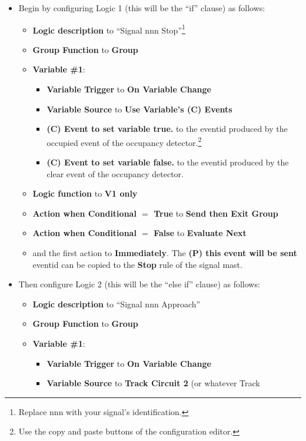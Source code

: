 \begin{itemize}
\item Begin by configuring Logic 1 (this will be the ``if'' clause) as 
follows: 
\begin{itemize}
\item \textbf{Logic description} to ``Signal nnn Stop''\footnote{Replace nnn 
with your signal's identification.}
\item \textbf{Group Function} to \textbf{Group}
\item \textbf{Variable \#1}:
\begin{itemize}
\item \textbf{Variable Trigger} to \textbf{On Variable Change}
\item \textbf{Variable Source} to \textbf{Use Variable's (C) Events}
\item \textbf{(C) Event to set variable true.} to the eventid produced by the 
occupied event of the occupancy detector.\footnote{Use the copy and paste 
buttons of the configuration editor.\label{fn:copypaste}}
\item \textbf{(C) Event to set variable false.} to the eventid produced by the 
clear event of the occupancy detector.
\end{itemize}
\item \textbf{Logic function} to \textbf{V1 only}
\item \textbf{Action when Conditional $=$ True} to \textbf{Send then Exit 
Group}
\item \textbf{Action when Conditional $=$ False} to \textbf{Evaluate Next}
\item and the first action to \textbf{Immediately}.  The \textbf{(P) this 
event will be sent} eventid can be copied to the \textbf{Stop} rule of the 
signal mast.
\end{itemize}
\item Then configure Logic 2  (this will be the ``else if'' clause) as follows:
\begin{itemize}
\item \textbf{Logic description} to ``Signal nnn Approach''
\item \textbf{Group Function} to \textbf{Group}
\item \textbf{Variable \#1}:
\begin{itemize}
\item \textbf{Variable Trigger} to \textbf{On Variable Change}
\item \textbf{Variable Source} to \textbf{Track Circuit 2} (or whatever Track 

\end{itemize}
\end{itemize}
\end{itemize}
